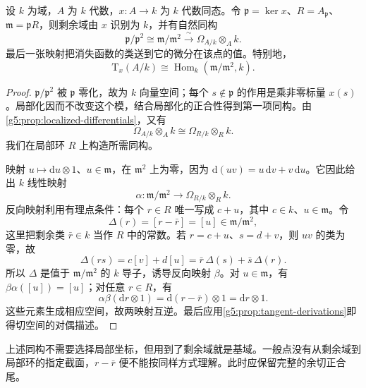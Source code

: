 \begin{theorem}\label{g5:thm:rational-cotangent-space}
	设 \(k\) 为域，\(A\) 为 \(k\) 代数，\(x:A\to k\) 为 \(k\) 代数同态。令 \(\mathfrak p=\ker x\)、\(R=A_{\mathfrak p}\)、\(\mathfrak m=\mathfrak pR\)，则剩余域由 \(x\) 识别为 \(k\)，并有自然同构
	\[
		\mathfrak p/\mathfrak p^2
		\cong\mathfrak m/\mathfrak m^2
		\xrightarrow{\ \sim\ }\Omega_{A/k}\otimes_A k.
	\]
	最后一张映射把消失函数的类送到它的微分在该点的值。特别地，
	\[
		\mathrm{T}_x(A/k)\cong
		\operatorname{Hom}_k(\mathfrak m/\mathfrak m^2,k).
	\]
\end{theorem}
\begin{proof}
	\(\mathfrak p/\mathfrak p^2\) 被 \(\mathfrak p\) 零化，故为 \(k\) 向量空间；每个 \(s\notin\mathfrak p\) 的作用是乘非零标量 \(x(s)\)。局部化因而不改变这个模，结合局部化的正合性得到第一项同构。由\cref{g5:prop:localized-differentials}，又有
	\[
		\Omega_{A/k}\otimes_A k
		\cong\Omega_{R/k}\otimes_R k.
	\]
	我们在局部环 \(R\) 上构造所需同构。

	映射 \(u\mapsto\mathrm{d}u\otimes1\)、\(u\in\mathfrak m\)，在 \(\mathfrak m^2\) 上为零，因为
	\(\mathrm{d}(uv)=u\,\mathrm{d}v+v\,\mathrm{d}u\)。它因此给出 \(k\) 线性映射
	\[
		\alpha:\mathfrak m/\mathfrak m^2
		\longrightarrow\Omega_{R/k}\otimes_R k.
	\]
	反向映射利用有理点条件：每个 \(r\in R\) 唯一写成 \(c+u\)，其中 \(c\in k\)、\(u\in\mathfrak m\)。令
	\[
		\Delta(r)=[r-\bar r]=[u]\in\mathfrak m/\mathfrak m^2,
	\]
	这里把剩余类 \(\bar r\in k\) 当作 \(R\) 中的常数。若 \(r=c+u\)、\(s=d+v\)，则 \(uv\) 的类为零，故
	\[
		\Delta(rs)=c[v]+d[u]
		=\bar r\,\Delta(s)+\bar s\,\Delta(r).
	\]
	所以 \(\Delta\) 是值于 \(\mathfrak m/\mathfrak m^2\) 的 \(k\) 导子，诱导反向映射 \(\beta\)。对 \(u\in\mathfrak m\)，有 \(\beta\alpha([u])=[u]\)；对任意 \(r\in R\)，有
	\[
		\alpha\beta(\mathrm{d}r\otimes1)
		=\mathrm{d}(r-\bar r)\otimes1
		=\mathrm{d}r\otimes1.
	\]
	这些元素生成相应空间，故两映射互逆。最后应用\cref{g5:prop:tangent-derivations}即得切空间的对偶描述。
\end{proof}

上述同构不需要选择局部坐标，但用到了剩余域就是基域。一般点没有从剩余域到局部环的指定截面，\(r-\bar r\) 便不能按同样方式理解。此时应保留完整的余切正合尾。


